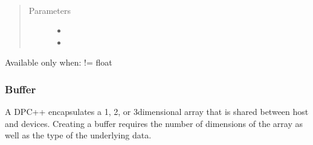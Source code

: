 \documentclass[letterpaper,10pt,english]{sphinxmanual}
\begin{document}
\begin{fulllineitems}
\begin{fulllineitems}
\pysigstopmultiline{}\label{\detokenize{programming-interface/data/atomic:_CPPv4N6atomic9fetch_maxE1T12memory_order}}%
\pysigstartmultiline
{}%
\pysigstopmultiline~\begin{quote}\begin{description}
\item[{Parameters}] \leavevmode\begin{itemize}
\item {} 
 \textendash{} 

\item {} 
 \textendash{} 

\end{itemize}

\end{description}\end{quote}

Available only when:  != float

\end{fulllineitems}


\end{fulllineitems}



\subsubsection{Buffer}
\label{\detokenize{programming-interface/data/buffer:buffer}}\label{\detokenize{programming-interface/data/buffer:id1}}\label{\detokenize{programming-interface/data/buffer::doc}}
A DPC++  encapsulates a 1\sphinxhyphen{}, 2\sphinxhyphen{}, or 3\sphinxhyphen{}dimensional array that is
shared between host and devices. Creating a buffer requires the number
of dimensions of the array as well as the type of the underlying data.
\end{document}
